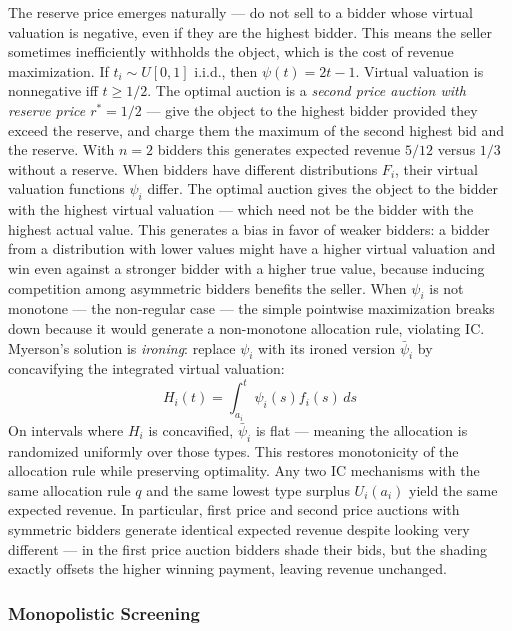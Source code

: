 \documentclass[11pt,english]{article}
\begin{document}
The reserve price emerges naturally --- do not sell to a bidder whose virtual valuation is negative, even if they are the highest bidder. This means the seller sometimes inefficiently withholds the object, which is the cost of revenue maximization. If $t_i \sim U[0,1]$ i.i.d., then $\psi(t) = 2t - 1$. Virtual valuation is nonnegative iff $t \geq 1/2$. The optimal auction is a \textit{second price auction with reserve price $r^* = 1/2$} --- give the object to the highest bidder provided they exceed the reserve, and charge them the maximum of the second highest bid and the reserve. With $n = 2$ bidders this generates expected revenue $5/12$ versus $1/3$ without a reserve. When bidders have different distributions $F_i$, their virtual valuation functions $\psi_i$ differ. The optimal auction gives the object to the bidder with the highest virtual valuation --- which need not be the bidder with the highest actual value. This generates a bias in favor of weaker bidders: a bidder from a distribution with lower values might have a higher virtual valuation and win even against a stronger bidder with a higher true value, because inducing competition among asymmetric bidders benefits the seller. When $\psi_i$ is not monotone --- the non-regular case --- the simple pointwise maximization breaks down because it would generate a non-monotone allocation rule, violating IC. Myerson's solution is \textit{ironing}: replace $\psi_i$ with its ironed version $\bar{\psi}_i$ by concavifying the integrated virtual valuation:
\begin{equation}
    H_i(t) = \int_{a_i}^{t} \psi_i(s) f_i(s)\, ds
\end{equation}
On intervals where $H_i$ is concavified, $\bar{\psi}_i$ is flat --- meaning the allocation is randomized uniformly over those types. This restores monotonicity of the allocation rule while preserving optimality. Any two IC mechanisms with the same allocation rule $q$ and the same lowest type surplus $U_i(a_i)$ yield the same expected revenue. In particular, first price and second price auctions with symmetric bidders generate identical expected revenue despite looking very different --- in the first price auction bidders shade their bids, but the shading exactly offsets the higher winning payment, leaving revenue unchanged.

\subsubsection{Monopolistic Screening}
\end{document}
